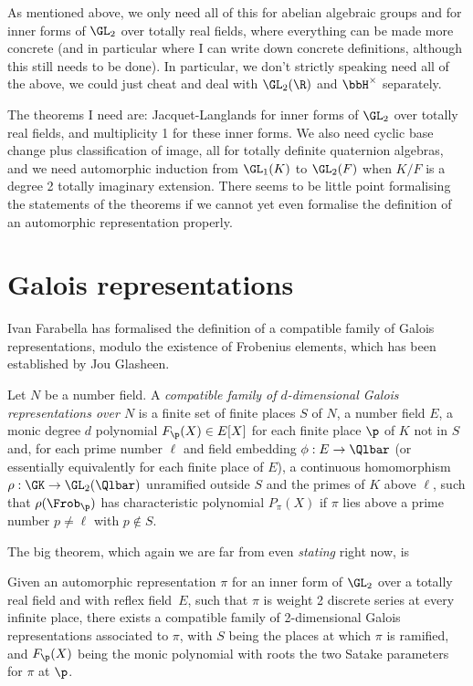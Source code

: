 As mentioned above, we only need all of this for abelian algebraic groups and for inner forms of $\GL_2$ over totally real fields, where everything can be made more concrete (and in particular where I can write down concrete definitions, although this still needs to be done). In particular, we don't strictly speaking need all of the above, we could just cheat and deal with $\GL_2(\R)$ and $\bbH^\times$ separately.

The theorems I need are: Jacquet-Langlands for inner forms of $\GL_2$ over totally real fields,
and multiplicity 1 for these inner forms. We also need cyclic base change plus classification of image, all for totally definite quaternion algebras, and we need
automorphic induction from $\GL_1(K)$ to $\GL_2(F)$ when $K/F$ is a degree 2 totally imaginary extension. There seems to be little point formalising the statements of the theorems if we cannot yet even formalise the definition of an automorphic representation properly.

\section{Galois representations}

Ivan Farabella has formalised the definition of a compatible family of Galois
representations, modulo the existence of Frobenius elements, which has been
established by Jou Glasheen.

\begin{definition}\label{compatible_family} Let $N$ be a number field. A \emph{compatible family of $d$-dimensional Galois representations over $N$} is a finite set of finite places $S$ of $N$,
a number field $E$, a monic degree $d$ polynomial $F_{\p}(X)\in E[X]$ for each finite place $\p$ of $K$ not in $S$ and, for each prime number $\ell$ and field embedding $\phi : E\to\Qlbar$ (or essentially equivalently for each finite place of $E$), a continuous homomorphism $\rho:\GK\to\GL_2(\Qlbar)$ unramified outside $S$ and the primes of $K$ above $\ell$, such that $\rho(\Frob_\p)$ has characteristic polynomial $P_\pi(X)$ if $\pi$ lies above a prime number $p\not=\ell$ with $p\not\in S$.
\end{definition}

The big theorem, which again we are far from even \emph{stating} right now, is

\begin{theorem}\label{Galois_representation_from_automorphic_representation_on_GL_2_form}\notready Given an automorphic representation $\pi$ for an inner form of $\GL_2$ over a totally real field and with reflex field~$E$, such that $\pi$ is weight 2 discrete series at every infinite place, there exists a compatible family of 2-dimensional Galois representations associated to $\pi$, with $S$ being the places at which $\pi$ is ramified, and $F_{\p}(X)$ being the monic polynomial with roots the two Satake parameters for $\pi$ at $\p$.
\end{theorem}

